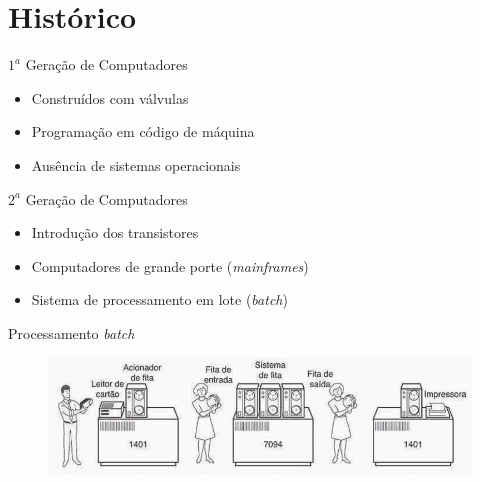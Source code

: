 \documentclass[aspectratio=169,
				xcolor=table]{beamer}
\begin{document}
	\section{Histórico}
	\begin{frame}{${1}^{a}$ Geração de Computadores}
		\begin{itemize}
			\item Construídos com válvulas
			\vspace{1em}
			\item Programação em código de máquina
			\vspace{1em}
			\item Ausência de sistemas operacionais
		\end{itemize}
	\end{frame}
	
	\begin{frame}{${2}^{a}$ Geração de Computadores}
		\begin{itemize}
			\item Introdução dos transistores
			\vspace{1em}
			\item Computadores de grande porte (\textit{mainframes})
			\vspace{1em}
			\item Sistema de processamento em lote (\textit{batch})
		\end{itemize}
	\end{frame}
	
	\begin{frame}{Processamento \textit{batch}}
	\begin{figure}[hbtp]
	\centering
	\includegraphics[width=.85\textwidth, keepaspectratio]{../figs/cap01/batch.png}
	\end{figure}
	
	\end{frame}
	
\end{document}

